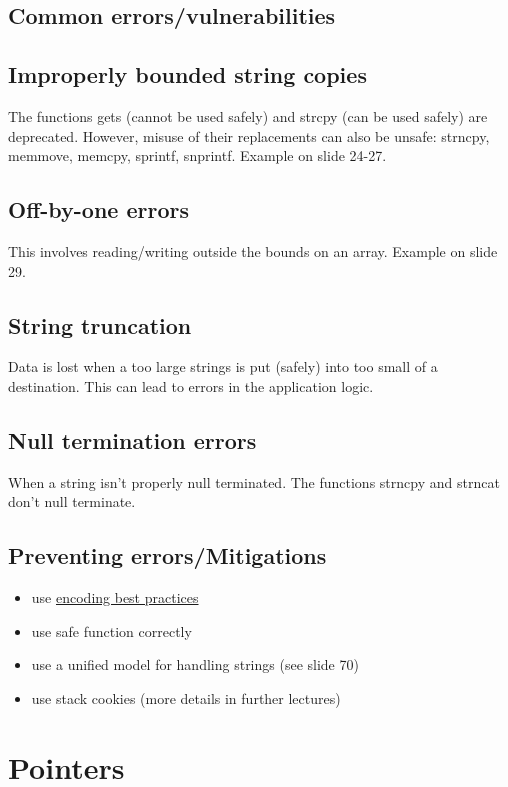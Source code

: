 \documentclass[letterpaper]{article}
\begin{document}
\subsection{Common errors/vulnerabilities}
\subsection{Improperly bounded string copies}
The functions gets (cannot be used safely) and strcpy (can be used safely) are deprecated. However, misuse of their replacements can also be unsafe: strncpy, memmove, memcpy, sprintf, snprintf. Example on slide 24-27.

\subsection{Off-by-one errors}
This involves reading/writing outside the bounds on an array. Example on slide 29.

\subsection{String truncation}
Data is lost when a too large strings is put (safely) into too small of a destination. This can lead to errors in the application logic.

\subsection{Null termination errors}
When a string isn't properly null terminated. The functions strncpy and strncat don't null terminate.

\subsection{Preventing errors/Mitigations}
\begin{itemize}
\item use \href{http://websec.github.io/unicode-security-guide/character-transformations/}{encoding best practices}
\item use safe function correctly
\item use a unified model for handling strings (see slide 70)
\item use stack cookies (more details in further lectures)
\end{itemize}

\section{Pointers}
\end{document}
